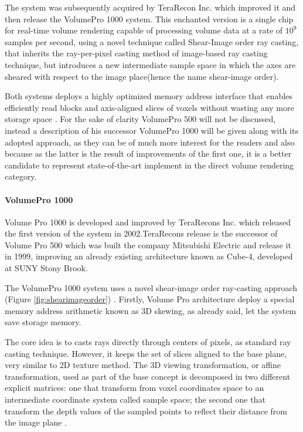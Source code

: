 \documentclass[12pt,a4paper]{extarticle}
\newcommand{\linespace}{\vspace{8pt}}
\begin{document}
The system was subsequently acquired by TeraRecon Inc. which improved it and then release the VolumePro 1000 system. This enchanted version is a single chip for real-time volume rendering capable of processing volume data at a rate of $10^9$ samples per second, using a novel technique called Shear-Image order ray casting, that inherits the ray-per-pixel casting method of image-based ray casting technique, but introduces a new intermediate sample space in which the axes are sheared with respect to the image place(hence the name shear-image order). 
\linespace

Both systems deploys a highly optimized memory address interface that enables efficiently read blocks and axis-aligned slices of voxels without wasting any more storage space \cite{Wu:2003:SOR:641480.641510}.
For the sake of clarity VolumePro 500 will not be discussed, instead a description of his successor VolumePro 1000 will be given along with its adopted approach, as they can be of much more interest for the readers and also because as the latter is the result of improvements of the first one, it is a better candidate to represent state-of-the-art implement in the direct volume rendering category. 


\paragraph{VolumePro 1000} Volume Pro 1000 is developed and improved by TeraRecons Inc. which released the first version of the system in 2002.TeraRecons release is the successor of Volume Pro 500 which was built  the company Mitsubishi Electric and release it in 1999, improving an already existing architecture known as Cube-4, developed at SUNY Stony Brook.
\linespace

The VolumePro 1000 system \cite {Wu:2003:SOR:641480.641510}
uses a novel shear-image order ray-casting approach (Figure \ref{fig:shearimageorder}) \cite{PFISTER2005229}.
 Firstly, Volume Pro architecture deploy a special memory address arithmetic known as 3D skewing, as already said, let the system save storage memory. 
\linespace

The core idea is to casts rays directly through centers of pixels, as standard ray casting technique. However, it keeps the set of slices aligned to the base plane, very similar to 2D texture method. The 3D viewing transformation, or affine transformation, used as part of the base concept is decomposed in two different explicit matrices: one that transform from voxel coordinates space to an intermediate coordinate system called sample space; the second one that transform the depth values of the sampled points to reflect their distance from the image plane \cite{PFISTER2005229}.
\end{document}

